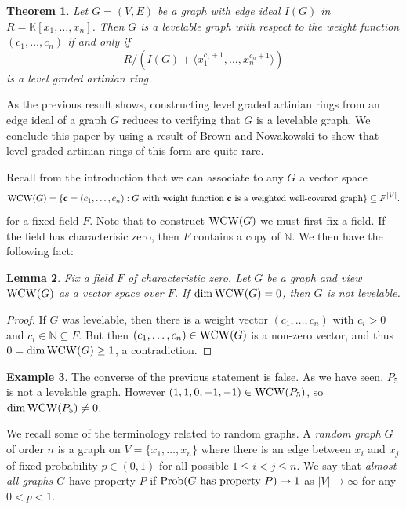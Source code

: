 \documentclass[12pt]{amsart}
\numberwithin{equation}{section}
\newtheorem{theorem}{Theorem}[section]
\newtheorem{lemma}[theorem]{Lemma}
\theoremstyle{definition}
\newtheorem{example}[theorem]{Example}
\newcounter{i} %
\begin{document}
\begin{theorem}\label{thm.constructartinina}
    Let $G = (V,E)$ be a graph with edge ideal $I(G)$ in 
    $R = \mathbb{K}[x_1,\ldots,x_n]$.  Then
    $G$ is a levelable graph with respect to the
    weight function $(c_1,\ldots,c_n)$ if and only if
    \[R/(I(G)+\langle x_1^{c_1+1},\ldots,x_n^{c_n+1}\rangle)\]
    is a level graded artinian ring.
\end{theorem}

As the previous result shows, constructing level graded artinian rings from
an edge ideal of a graph $G$ reduces to verifying that $G$ is a levelable graph.
We conclude this paper by using 
a result of Brown and Nowakowski \cite{BN2007}
to show that level graded artinian 
rings of this form are quite rare.

Recall from the introduction that we can associate to any
$G$ a vector space
\footnotesize
\[{\rm WCW}(G) = \{ {\bf c} = 
(c_1,\ldots,c_n) : \mbox{$G$ with weight function {\bf c} is a weighted well-covered graph}\} \subseteq F^{|V|}.\]
\normalsize
for a fixed field $F$.  
Note that to construct ${\rm WCW}(G)$ 
we must first fix a field.  If the field has characterisic zero,
then $F$ contains a copy of $\mathbb{N}$. We then have
the following fact:

\begin{lemma}\label{lem.wcwdim}
    Fix a field $F$ of characteristic zero. Let $G$ be a graph
    and view ${\rm WCW}(G)$ as a vector space over $F$. 
    If $\dim {\rm WCW}(G) = 0$, then $G$ is not levelable.
\end{lemma}

\begin{proof}
    If $G$ was levelable, then there is a weight vector $(c_1,\ldots,c_n)$
    with $c_i > 0$ and $c_i \in \mathbb{N} \subseteq F$.  But then
    $(c_1,\ldots,c_n) \in {\rm WCW}(G)$ is a non-zero vector,
    and thus $0 = \dim {\rm WCW}(G) \geq 1$, a contradiction.
\end{proof}
\begin{example}
    The converse of the previous statement is false.  As
    we have seen, $P_5$ is not a levelable graph. However
    $(1,1,0,-1,-1) \in {\rm WCW}(P_5)$, so $\dim {\rm WCW}(P_5) \neq 0$.
\end{example}

We recall some of the terminology related to random graphs.  A {\it random graph
$G$} of order $n$ is a graph on $V = \{x_1,\ldots,x_n\}$ where there is
an edge between $x_i$ and $x_j$ of fixed probability $p \in (0,1)$ for
all possible $1 \leq i  < j \leq n$.  We say that {\it almost all graphs $G$} 
have property $P$ if ${\rm Prob}(\mbox{$G$ has property $P$}) \rightarrow 1$
as $|V| \rightarrow \infty$ for any $0 < p < 1$.
\end{document}
